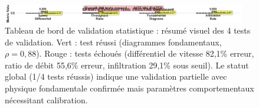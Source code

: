 \begin{figure}[H]
    \centering
    \includegraphics[width=0.95\textwidth]{SPRINT4_DELIVERABLES/figures/statistical_validation.pdf}
    \caption{Tableau de bord de validation statistique : résumé visuel des 4 tests de validation.
        Vert : test réussi (diagrammes fondamentaux, $\rho = 0{,}88$).
        Rouge : tests échoués (différentiel de vitesse 82,1\% erreur, ratio de débit 55,6\% erreur, infiltration 29,1\% sous seuil).
        Le statut global (1/4 tests réussis) indique une validation partielle avec physique fondamentale confirmée mais paramètres comportementaux nécessitant calibration.}
    \label{fig:statistical_validation}
\end{figure}


